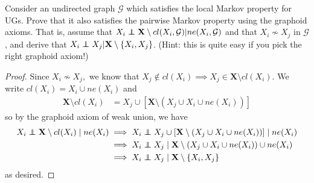 \documentclass[letterpaper]{article}
\def\independenT#1#2{\mathrel{\rlap{$#1#2$}\mkern2mu{#1#2}}}
\newcommand\indep{\protect\mathpalette{\protect\independenT}{\perp}}
\def\independenT#1#2{\mathrel{\rlap{$#1#2$}\mkern2mu{#1#2}}}
\begin{document}
Consider an undirected graph $\mathcal{G}$ which satisfies the local Markov property for UGs. Prove that it also satisfies the pairwise Markov property using the graphoid axioms. That is, assume that $X_i \indep \mathbf{X} \setminus cl(X_i, \mathcal{G}) | ne(X_i,\mathcal{G})$ and that $X_i \not\sim X_j$ in $\mathcal{G}$, and derive that $X_i \indep X_j | \mathbf{X} \setminus \{X_i,X_j\}$. (Hint: this is quite easy if you pick the right graphoid axiom!)
\begin{proof}
  Since $X_i\not\sim X_j,$ we know that $X_j\not\in cl(X_i)\implies X_j\in \mathbf{X}\setminus cl(X_i).$ We write $cl(X_i)=X_i\cup ne(X_i)$ and
  \begin{align*}
    \mathbf{X} \setminus cl(X_i) &= X_j\cup \left[ \mathbf{X}\setminus\left( X_j\cup X_i\cup ne(X_i) \right) \right]
  \end{align*}
  so by the graphoid axiom of weak union, we have
  \begin{align*}
    X_i\indep \mathbf{X}\setminus cl(X_i)\mid ne(X_i) &\implies X_i\indep X_j\cup \left[ \mathbf{X}\setminus\left( X_j\cup X_i\cup  ne(X_i) \right) \right] \mid ne(X_i) \\
    &\implies X_i\indep X_j\mid \mathbf{X} \setminus \left( X_j\cup X_i\cup ne(X_i) \right)\cup ne(X_i) \\
    &\implies X_i\indep X_j\mid \mathbf{X}\setminus\left\{ X_i, X_j \right\}
  \end{align*}
  as desired.
\end{proof}

\newpage
\end{document}
